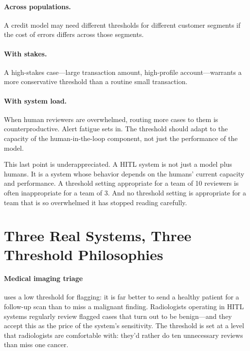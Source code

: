 \paragraph{Across populations.} A credit model may need different thresholds for different customer segments if the cost of errors differs across those segments.

\paragraph{With stakes.} A high-stakes case---large transaction amount, high-profile account---warrants a more conservative threshold than a routine small transaction.

\paragraph{With system load.} When human reviewers are overwhelmed, routing more cases to them is counterproductive. Alert fatigue sets in. The threshold should adapt to the capacity of the human-in-the-loop component, not just the performance of the model.

\begin{cautionbox}
This last point is underappreciated. A HITL system is not just a model plus humans. It is a system whose behavior depends on the humans' current capacity and performance. A threshold setting appropriate for a team of 10 reviewers is often inappropriate for a team of 3. And no threshold setting is appropriate for a team that is so overwhelmed it has stopped reading carefully.
\end{cautionbox}

\section{Three Real Systems, Three Threshold Philosophies}

\paragraph{Medical imaging triage} uses a low threshold for flagging: it is far better to send a healthy patient for a follow-up scan than to miss a malignant finding. Radiologists operating in HITL systems regularly review flagged cases that turn out to be benign---and they accept this as the price of the system's sensitivity. The threshold is set at a level that radiologists are comfortable with: they'd rather do ten unnecessary reviews than miss one cancer.

